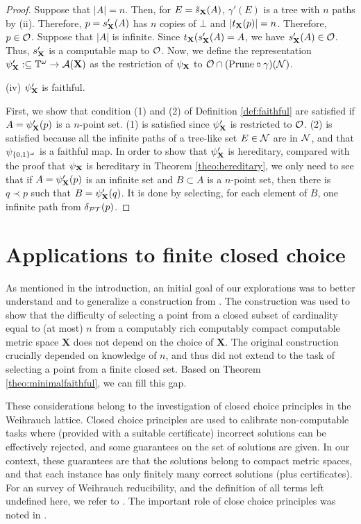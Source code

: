 \documentclass{eptcs-modified}
\begin{document}
\begin{theorem}
\begin{proof}
Suppose that $|A| = n$.  Then, for $E = \tilde{s}_{\mathbf{X}}(A)$,  $\gamma'(E)$ is a tree with $n$ paths by (ii).  Therefore, $p = s_{\mathbf{X}}'(A)$ has $n$ copies of $\bot$ and $|t_{\mathbf{X}} (p)| = n$.   Therefore, $p \in {\cal O}$.
Suppose that $|A|$ is infinite. Since $t_{\mathbf{X}} ( s_{\mathbf{X}}'(A) = A$, we have $s_{\mathbf{X}}'(A) \in {\cal O}$.
Thus, $s_{\mathbf{X}}' $ is a computable map to ${\cal O}$.
Now, we define the representation $\psi'_{\mathbf{X}} :\subseteq \mathbb{T}^\omega \to \mathcal{A}(\mathbf{X})$ as the restriction of $\psi_{\mathbf{X}}$ to ${\cal O} \cap (\textrm{Prune} \circ \gamma) (\mathcal{N})$.

(iv) $\psi'_{\mathbf{X}}$ is faithful.

First, we show that
condition (1) and (2) of  Definition \ref{def:faithful} are satisfied
if $A = \psi'_{\mathbf{X}}(p)$ is a $n$-point set.
(1) is satisfied since $\psi'_{\mathbf{X}}$ is restricted to  ${\cal O}$.
(2) is satisfied because all the infinite paths of a tree-like set $E \in {\cal N}$ are in ${\cal N}$, and
that $\psi_{\{0,1\}^\omega}$ is a faithful map.
In order to show that $\psi_{\mathbf{X}}'$ is hereditary, compared with the proof that
$\psi_{\mathbf{X}}$ is hereditary in Theorem \ref{theo:hereditary},
we only need to see that if $A = \psi'_{\mathbf{X}}(p)$ is an infinite set and $B \subset A$ is a $n$-point set, then there is $q \prec p$ such that $B = \psi'_{\mathbf{X}}(q)$.
It is done by selecting, for each element of $B$,  one infinite path from $\delta_{\mathcal{PT}}(p)$.
\end{proof}
\end{theorem}


\section{Applications to finite closed choice}
\label{sec:weihrauch}
As mentioned in the introduction, an initial goal of our explorations was to better understand and to generalize a construction from \cite{paulyleroux}. The construction was used to show that the difficulty of selecting a point from a closed subset of cardinality equal to (at most) $n$ from a computably rich computably compact computable metric space $\mathbf{X}$ does not depend on the choice of $\mathbf{X}$. The original construction crucially depended on knowledge of $n$, and thus did not extend to the task of selecting a point from a finite closed set. Based on Theorem \ref{theo:minimalfaithful}, we can fill this gap.

These considerations belong to the investigation of closed choice principles in the Weihrauch lattice. Closed choice principles are used to calibrate non-computable tasks where (provided with a suitable certificate) incorrect solutions can be effectively rejected, and some guarantees on the set of solutions are given. In our context, these guarantees are that the solutions belong to compact metric spaces, and that each instance has only finitely many correct solutions (plus certificates). For an survey of Weihrauch reducibility, and the definition of all terms left undefined here, we refer to \cite{pauly-handbook}. The important role of close choice principles was noted in \cite{paulybrattka}.
\end{document}
